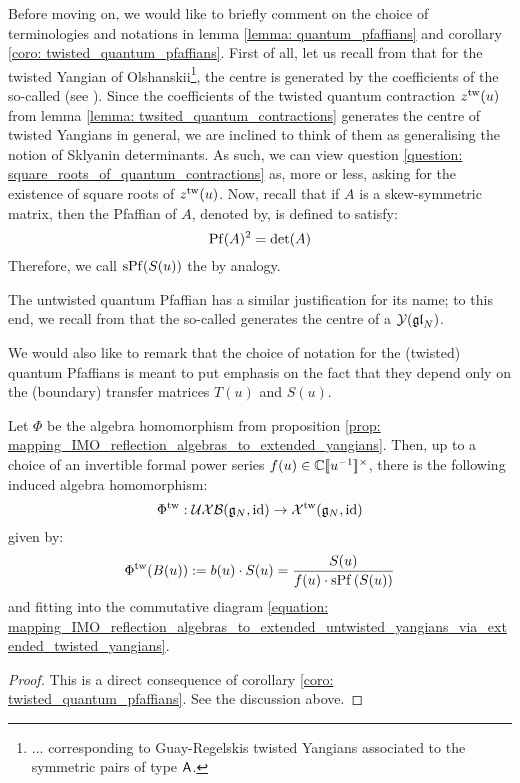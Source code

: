            \begin{remark}
                Before moving on, we would like to briefly comment on the choice of terminologies and notations in lemma \ref{lemma: quantum_pfaffians} and corollary \ref{coro: twisted_quantum_pfaffians}. First of all, let us recall from \cite[Section 2.5]{molev_yangians_and_classical_lie_algebras} that for the twisted Yangian of Olshanskii\footnote{... corresponding to Guay-Regelskis twisted Yangians associated to the symmetric pairs of type $\mathsf{A}$.}, the centre is generated by the coefficients of the so-called  (see \cite[Definition 2.5.2]{molev_yangians_and_classical_lie_algebras}). Since the coefficients of the twisted quantum contraction $z^{\mathrm{tw}}(u)$ from lemma \ref{lemma: twsited_quantum_contractions} generates the centre of twisted Yangians in general, we are inclined to think of them as generalising the notion of Sklyanin determinants. As such, we can view question \ref{question: square_roots_of_quantum_contractions} as, more or less, asking for the existence of square roots of $z^{\mathrm{tw}}(u)$. Now, recall that if $A$ is a skew-symmetric matrix, then the Pfaffian of $A$, denoted by, is defined to satisfy:
                    $$\operatorname{Pf}(A)^2 = \det(A)$$
                Therefore, we call $\operatorname{sPf}( S(u) )$ the  by analogy.

                The untwisted quantum Pfaffian has a similar justification for its name; to this end, we recall from \cite[Section 1.6]{molev_yangians_and_classical_lie_algebras} that the so-called  generates the centre of a $\mathcal{Y}(\mathfrak{gl}_N)$.

                We would also like to remark that the choice of notation for the (twisted) quantum Pfaffians is meant to put emphasis on the fact that they depend only on the (boundary) transfer matrices $T(u)$ and $S(u)$.
            \end{remark}
                
            \begin{proposition} \label{prop: mapping_IMO_reflection_algebras_to_extended_untwisted_yangians_via_extended_twisted_yangians}
                Let $\Phi$ be the algebra homomorphism from proposition \ref{prop: mapping_IMO_reflection_algebras_to_extended_yangians}. Then, up to a choice of an invertible formal power series $f(u) \in \bbC[\![u^{-1}]\!]^{\x}$, there is the following induced algebra homomorphism:
                    $$\Phi^{\mathrm{tw}}: \mathcal{UXB}(\mathfrak{g}_N, \mathrm{id}) \to \mathcal{X}^{\mathrm{tw}}(\mathfrak{g}_N, \mathrm{id})$$
                given by:
                    $$\Phi^{\mathrm{tw}}( B(u) ) := b(u) \cdot S(u) = \frac{ S(u) }{ f(u) \cdot \operatorname{sPf}\left( S(u) \right) }$$
                and fitting into the commutative diagram \eqref{equation: mapping_IMO_reflection_algebras_to_extended_untwisted_yangians_via_extended_twisted_yangians}.
            \end{proposition}
                \begin{proof}
                    This is a direct consequence of corollary \ref{coro: twisted_quantum_pfaffians}. See the discussion above.
                \end{proof}

